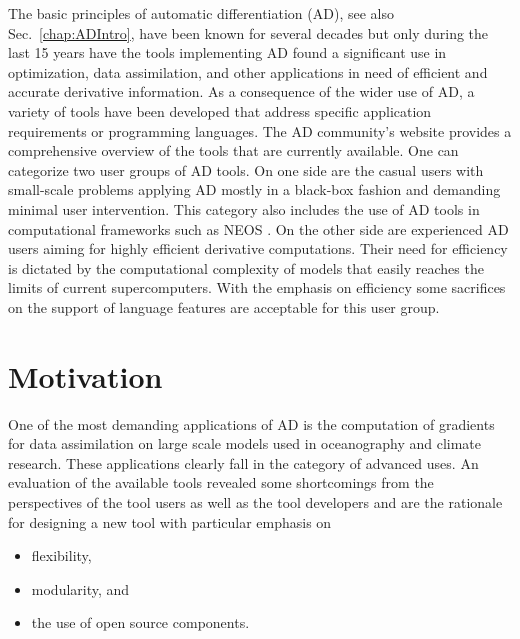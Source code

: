 \documentclass{book}
\newcommand{\refsec}[1]{{Sec.~\ref{#1}}}
\begin{document}
The basic principles of automatic differentiation (AD), see also \refsec{chap:ADIntro}, 
have been known for several decades \cite{wengert}
but only during the last 15 years have the tools implementing AD found a significant use in 
optimization, data assimilation, and other applications in need of efficient and accurate 
derivative information. 
As a consequence of the wider use of AD, 
a variety of tools have been developed that address specific 
application requirements or programming languages. 
The  AD community's website \cite{autodiffWeb} 
provides a comprehensive overview of the tools that 
are currently available. 
One can categorize two user groups of AD tools. 
On one side are the casual users 
with small-scale problems applying AD mostly in a black-box fashion 
and demanding minimal user intervention. 
This category also includes the use of AD tools in  computational 
frameworks such as NEOS \cite{neosWeb}.
On the other side are experienced AD users aiming for highly efficient 
derivative computations.
Their need for efficiency is dictated by the 
computational complexity of models that easily reaches the limits of  current 
supercomputers. 
With the emphasis on efficiency some sacrifices on the support of 
language features are acceptable for this user group.  

\section{Motivation}

One of the most demanding applications of AD is the computation of gradients for 
data assimilation on large scale models used in oceanography and climate research. 
These applications clearly fall in the category of advanced uses.
An evaluation of the available tools revealed some shortcomings from the perspectives 
of the tool users as well as the tool developers and are the rationale for 
designing a new tool with particular emphasis on   
\begin{itemize}
\item flexibility,
\item modularity, and
\item the use of open source components.
\end{itemize} 
\end{document}
